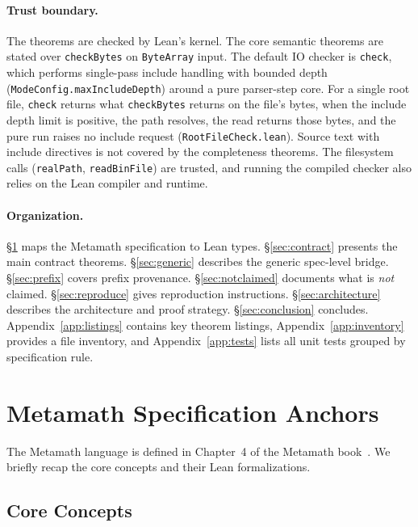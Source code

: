 \documentclass[11pt]{article}
\newcommand{\lean}[1]{\lstinline[language=Lean4]{#1}}
\newcommand{\file}[1]{\texttt{#1}}
\begin{document}
\paragraph{Trust boundary.}
The theorems are checked by Lean's kernel.  The core semantic theorems
are stated over \lean{checkBytes} on \lean{ByteArray} input.  The default
IO checker is \lean{check}, which performs single-pass include handling
with bounded depth (\lean{ModeConfig.maxIncludeDepth}) around a pure
parser-step core.  For a single root file, \lean{check} returns what
\lean{checkBytes} returns on the file's bytes, when the include depth
limit is positive, the path resolves, the read returns those bytes, and
the pure run raises no include request (\file{RootFileCheck.lean}).
Source text with include directives is not covered by the completeness
theorems.  The filesystem calls (\lean{realPath}, \lean{readBinFile}) are
trusted, and running the compiled checker also relies on the Lean
compiler and runtime.

\paragraph{Organization.}
\S\ref{sec:spec} maps the Metamath specification to Lean types.
\S\ref{sec:contract} presents the main contract theorems.
\S\ref{sec:generic} describes the generic spec-level bridge.
\S\ref{sec:prefix} covers prefix provenance.
\S\ref{sec:notclaimed} documents what is \emph{not} claimed.
\S\ref{sec:reproduce} gives reproduction instructions.
\S\ref{sec:architecture} describes the architecture and proof strategy.
\S\ref{sec:conclusion} concludes.
Appendix~\ref{app:listings} contains key theorem listings,
Appendix~\ref{app:inventory} provides a file inventory, and
Appendix~\ref{app:tests} lists all unit tests grouped by specification
rule.

\section{Metamath Specification Anchors}
\label{sec:spec}

The Metamath language is defined in Chapter~4 of the Metamath
book~\cite{megill2019}.  We briefly recap the core concepts and their
Lean formalizations.

\subsection{Core Concepts}
\end{document}
